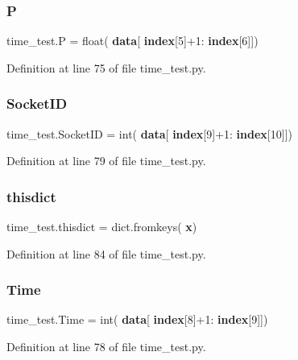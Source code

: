 \subsubsection{P}
{\footnotesize\ttfamily time\+\_\+test.\+P = float(\textbf{ data}[\textbf{ index}[5]+1\+:\textbf{ index}[6]])}



Definition at line 75 of file time\+\_\+test.\+py.

\mbox{\label{namespacetime__test_a26c65864996d01ed5f6e2cb6c637f539}} 
\subsubsection{Socket\+ID}
{\footnotesize\ttfamily time\+\_\+test.\+Socket\+ID = int(\textbf{ data}[\textbf{ index}[9]+1\+:\textbf{ index}[10]])}



Definition at line 79 of file time\+\_\+test.\+py.

\mbox{\label{namespacetime__test_abefdbdcc75085024d8bd5ddabddec0f1}} 
\subsubsection{thisdict}
{\footnotesize\ttfamily time\+\_\+test.\+thisdict = dict.\+fromkeys(\textbf{ x})}



Definition at line 84 of file time\+\_\+test.\+py.

\mbox{\label{namespacetime__test_a17ddb4826f1f81df3d5038ec5ba017c2}} 
\subsubsection{Time}
{\footnotesize\ttfamily time\+\_\+test.\+Time = int(\textbf{ data}[\textbf{ index}[8]+1\+:\textbf{ index}[9]])}



Definition at line 78 of file time\+\_\+test.\+py.

\mbox{\label{namespacetime__test_afb43f6c67d680d08fd2ad9fb6828f18e}} 
